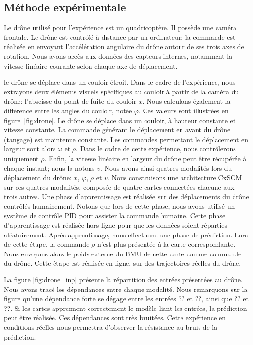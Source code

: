 \subsection{Méthode expérimentale}

Le drône utilisé pour l'expérience est un quadricoptère. Il possède une caméra frontale.
Le drône est contrôlé à distance par un ordinateur; la commande est réalisée en envoyant l'accélération angulaire du drône autour de ses trois axes de rotation.
Nous avons accès aux données des capteurs internes, notamment la vitesse linéaire courante selon chaque axe de déplacement.

le drône se déplace dans un couloir étroit.
Dans le cadre de l'expérience, nous extrayons deux éléments visuels spécifiques au couloir à partir de la caméra du drône: l'abscisse du point de fuite du couloir $x$. Nous calculons également la différence entre les angles du couloir, notée $\varphi$. Ces valeurs sont illustrées en figure~\ref{fig:drone}.
Le drône se déplace dans un couloir, à hauteur constante et vitesse constante.
La commande générant le déplacement en avant du drône (tangage) est maintenue constante. Les commandes permettant le déplacement en largeur sont alors $\omega$ et $\rho$. Dans le cadre de cette expérience, nous contrôlerons uniquement $\rho$.
Enfin, la vitesse linéaire en largeur du drône peut être récupérée à chaque instant; nous la notons $v$.
Nous avons ainsi quatres modalités lors du déplacement du drône: $x$, $\varphi$, $\rho$ et $v$.
Nous construisons une architecture CxSOM sur ces quatres modalités, composée de quatre cartes connectées chacune aux trois autres.
Une phase d'apprentissage est réalisée sur des déplacements du drône contrôlés humainement. Notons que lors de cette phase, nous avons utilisé un système de contrôle PID pour assister la commande humaine. Cette phase d'apprentissage est réalisée hors ligne pour que les données soient réparties aléatoirement.
Après apprentissage, nous effectuons une phase de prédiction. Lors de cette étape, la commande $\rho$ n'est plus présentée à la carte correspondante. Nous envoyons alors le poids externe du BMU de cette carte comme commande du drône. Cette étape est réalisée en ligne, sur des trajectoires réelles du drône.

La figure \ref{fig:drone_inp} présente la répartition des entrées présentées au drône. Nous avons tracé les dépendances entre chaque modalité. Nous remarquons sur la figure qu'une dépendance forte se dégage entre les entrées ?? et ??, ainsi que ?? et ??. Si les cartes apprennent correctement le modèle liant les entrées, la prédiction peut être réalisée.
Ces dépendances sont très bruitées. Cette expérience en conditions réelles nous permettra d'observer la résistance au bruit de la prédiction.

